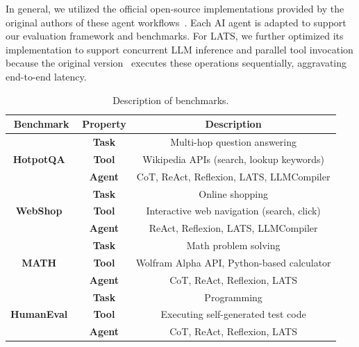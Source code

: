 In general, we utilized the official open-source implementations provided by the original authors of these agent workflows~\cite{react_github,reflexion_github,lats_github,llmcompiler_github}. Each AI agent is adapted to support our evaluation framework and benchmarks. For LATS, we further optimized its implementation to support concurrent LLM inference and parallel tool invocation because the original version~\cite{lats_github} executes these operations sequentially, aggravating end-to-end latency.

\begin{scriptsize}
\begin{table}[t]
\centering
\caption{Description of benchmarks.}
\scriptsize
\begin{tabular}{ccc}
\hline
\textbf{Benchmark} & \textbf{Property} & \textbf{Description} \\ \hline\hline
\multirow{3}{*}{\textbf{HotpotQA}~\cite{hotpotqa}} 
    & \textbf{Task} & Multi-hop question answering \\ \cline{2-3}
    & \textbf{Tool} & Wikipedia APIs (search, lookup keywords)\\ \cline{2-3}
    & \textbf{Agent} & CoT, ReAct, Reflexion, LATS, LLMCompiler \\ \hline
\multirow{3}{*}{\textbf{WebShop}~\cite{webshop}} 
    & \textbf{Task} & Online shopping \\ \cline{2-3}
    & \textbf{Tool} & Interactive web navigation (search, click) \\ \cline{2-3}
    & \textbf{Agent} & ReAct, Reflexion, LATS, LLMCompiler \\ \hline
\multirow{3}{*}{\textbf{MATH}~\cite{math}} 
    & \textbf{Task} & Math problem solving \\ \cline{2-3}
    & \textbf{Tool} & Wolfram Alpha API, Python-based calculator \\ \cline{2-3}
    & \textbf{Agent} & CoT, ReAct, Reflexion, LATS \\ \hline
\multirow{3}{*}{\textbf{HumanEval}~\cite{humaneval}} 
    & \textbf{Task} & Programming \\ \cline{2-3}
    & \textbf{Tool} & Executing self-generated test code \\ \cline{2-3}
    & \textbf{Agent} & CoT, ReAct, Reflexion, LATS \\ \hline
\end{tabular}
\label{tab:benchmarks}
\end{table}
\end{scriptsize}


